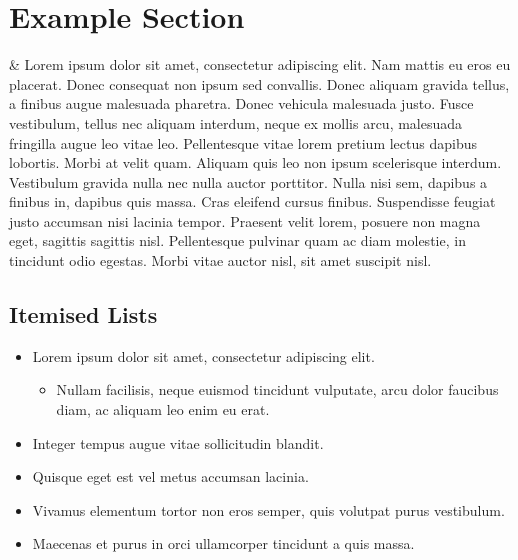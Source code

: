 \documentclass{article}
\begin{document}



\section{Example Section} \label{ExampleSectionLabel}
\& Lorem ipsum dolor sit amet, consectetur adipiscing elit. Nam mattis eu eros eu placerat. Donec consequat non ipsum sed convallis. Donec aliquam gravida tellus, a finibus augue malesuada pharetra. Donec vehicula malesuada justo. Fusce vestibulum, tellus nec aliquam interdum, neque ex mollis arcu, malesuada fringilla augue leo vitae leo. Pellentesque vitae lorem pretium lectus dapibus lobortis. Morbi at velit quam. Aliquam quis leo non ipsum scelerisque interdum. Vestibulum gravida nulla nec nulla auctor porttitor. Nulla nisi sem, dapibus a finibus in, dapibus quis massa. Cras eleifend cursus finibus. Suspendisse feugiat justo accumsan nisi lacinia tempor. Praesent velit lorem, posuere non magna eget, sagittis sagittis nisl. Pellentesque pulvinar quam ac diam molestie, in tincidunt odio egestas. Morbi vitae auctor nisl, sit amet suscipit nisl. 

\subsection{Itemised Lists}
\begin{itemize}
    \item Lorem ipsum dolor sit amet, consectetur adipiscing elit.
    \begin{itemize}
        \item Nullam facilisis, neque euismod tincidunt vulputate, arcu dolor faucibus diam, ac aliquam leo enim eu erat.
    \end{itemize}
    \item Integer tempus augue vitae sollicitudin blandit.
    \item Quisque eget est vel metus accumsan lacinia.
    \item Vivamus elementum tortor non eros semper, quis volutpat purus vestibulum.
    \item Maecenas et purus in orci ullamcorper tincidunt a quis massa.
\end{itemize}
\end{document}
